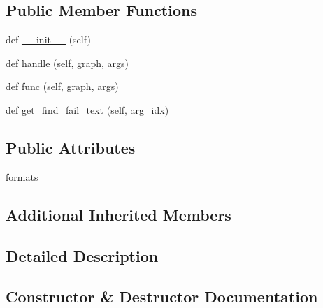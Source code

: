 \subsection*{Public Member Functions}
\begin{DoxyCompactItemize}
\item 
def \hyperlink{classlight__chats_1_1graph_1_1HitFunction_acd01defd21c4e2e69d7728458887c1b2}{\+\_\+\+\_\+init\+\_\+\+\_\+} (self)
\item 
def \hyperlink{classlight__chats_1_1graph_1_1HitFunction_afcc616271cdc3acede3dcabdfe516598}{handle} (self, graph, args)
\item 
def \hyperlink{classlight__chats_1_1graph_1_1HitFunction_a5154430a7ff1b987446b904c8238eef2}{func} (self, graph, args)
\item 
def \hyperlink{classlight__chats_1_1graph_1_1HitFunction_a3682574dfb01b39b2cec972e8a90d762}{get\+\_\+find\+\_\+fail\+\_\+text} (self, arg\+\_\+idx)
\end{DoxyCompactItemize}
\subsection*{Public Attributes}
\begin{DoxyCompactItemize}
\item 
\hyperlink{classlight__chats_1_1graph_1_1HitFunction_a52f8cfade8a8bd90e48e125bc2232e44}{formats}
\end{DoxyCompactItemize}
\subsection*{Additional Inherited Members}


\subsection{Detailed Description}
\begin{DoxyVerb}
\end{DoxyVerb}
 

\subsection{Constructor \& Destructor Documentation}
\mbox{\label{classlight__chats_1_1graph_1_1HitFunction_acd01defd21c4e2e69d7728458887c1b2}} 
